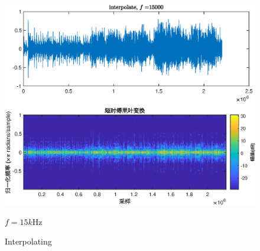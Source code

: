 \documentclass[fontset=macnew]{article}
\begin{document}
\begin{figure}[htbp]
\begin{minipage}[b]{0.32\linewidth}
		\includegraphics[width=\linewidth]{interpolate_15000.eps}
		\caption*{$f=15k$Hz}
		\label{int15}
	\end{minipage}
	\caption{Interpolating}
	\label{int}
\end{figure}
\end{document}
